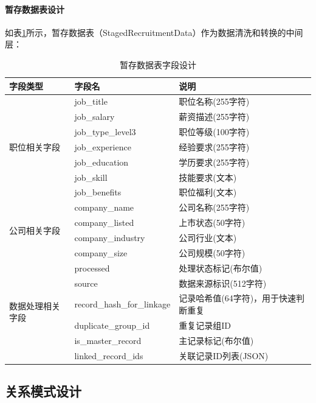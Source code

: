 \paragraph{暂存数据表设计}
如表\ref{tab:staged_recruitment_data_fields}所示，暂存数据表（StagedRecruitmentData）作为数据清洗和转换的中间层：

\begin{table}[htbp]
  \centering
  \caption{暂存数据表字段设计}
  \label{tab:staged_recruitment_data_fields}
  \begin{tabular}{@{}lll@{}} 
    \toprule
    \textbf{字段类型} & \textbf{字段名} & \textbf{说明} \\ 
    \midrule
    \multirow{7}{*}{职位相关字段} 
    & job\_title & 职位名称(255字符) \\
    & job\_salary & 薪资描述(255字符) \\
    & job\_type\_level3 & 职位等级(100字符) \\
    & job\_experience & 经验要求(255字符) \\
    & job\_education & 学历要求(255字符) \\
    & job\_skill & 技能要求(文本) \\
    & job\_benefits & 职位福利(文本) \\
    \midrule
    \multirow{4}{*}{公司相关字段}
    & company\_name & 公司名称(255字符) \\
    & company\_listed & 上市状态(50字符) \\
    & company\_industry & 公司行业(文本) \\
    & company\_size & 公司规模(50字符) \\
    \midrule
    \multirow{6}{*}{数据处理相关字段}
    & processed & 处理状态标记(布尔值) \\
    & source & 数据来源标识(512字符) \\
    & record\_hash\_for\_linkage & 记录哈希值(64字符)，用于快速判断重复 \\
    & duplicate\_group\_id & 重复记录组ID \\
    & is\_master\_record & 主记录标记(布尔值) \\
    & linked\_record\_ids & 关联记录ID列表(JSON) \\
    \bottomrule
  \end{tabular}
\end{table}

\subsection{关系模式设计}

